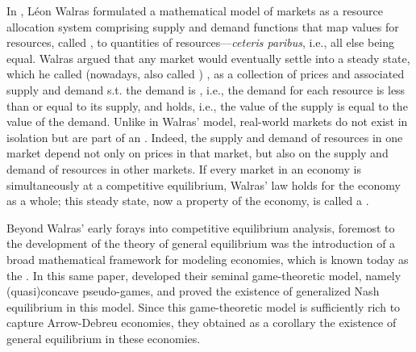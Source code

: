 In \citeyear{walras}, L\'eon Walras formulated a mathematical model of markets as a resource allocation system comprising supply and demand functions that map values for resources, called , to quantities of resources---\emph{ceteris paribus}, i.e., all else being equal.
Walras argued that any market would eventually settle into a steady state, which he called  (nowadays, also called ) , as a collection of prices and associated supply and demand s.t.\@ 
the demand is , i.e., the demand for each resource is less than or equal to its supply, and  holds, i.e., the value of the supply is equal to the value of the demand.
Unlike in Walras' model, real-world markets do not exist in isolation but are part of an .
Indeed, the supply and demand of resources in one market depend not only on prices in that market, but also on the supply and demand of resources in other markets.
If every market in an economy is simultaneously at a competitive equilibrium, Walras' law holds for the economy as a whole; this steady state, now a property of the economy, is called a .

Beyond Walras' early forays into competitive equilibrium analysis, foremost to the development of the theory of general equilibrium was the introduction of a broad mathematical framework for modeling economies, which is known today as the 
\cite{arrow-debreu}.
In this same paper, \citeauthor{arrow-debreu} developed their seminal game-theoretic model, namely (quasi)concave pseudo-games, and proved the existence of generalized Nash equilibrium in this model.
Since this game-theoretic model is sufficiently rich to capture Arrow-Debreu economies, they obtained as a corollary the existence of general equilibrium in these economies.



